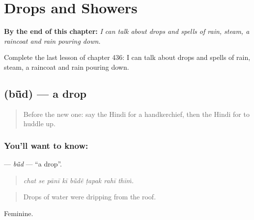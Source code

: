 
\chapter{Drops and Showers}
\label{ch:hi-drops-and-showers}

\begin{chapteropening}
\textbf{By the end of this chapter:} \emph{I can talk about drops and spells of rain, steam, a raincoat and rain pouring down.}

Complete the last lesson of chapter 436: I can talk about drops and spells of rain, steam, a raincoat and rain pouring down.
\end{chapteropening}

\section[\texorpdfstring{\hi{बूँद} (bū̃d)}{बूँद (bū̃d)}]{ (bū̃d) — a drop}

\label{lesson:HI-C436-bud}



\begin{quote}
Before the new one: say the Hindi for a handkerchief, then the Hindi for to huddle up.
\end{quote}

\subsection*{You'll want to know: }
\textbf{} — \emph{bū̃d} — \textquotedblleft{}a drop\textquotedblright{}.

\begin{quote}
       
\end{quote}

\begin{quote}
\emph{chat se pānī kī bū̃dẽ ṭapak rahī thīṁ.}
\end{quote}

\begin{quote}
Drops of water were dripping from the roof.
\end{quote}

Feminine.

